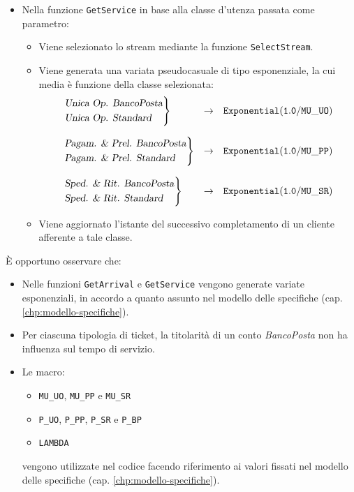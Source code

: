 \begin{itemize}
\item Nella funzione \texttt{GetService} in base alla classe d'utenza passata come parametro:
\begin{itemize}
\item Viene selezionato lo stream mediante la funzione \texttt{SelectStream}.
\item Viene generata una variata pseudocasuale di tipo esponenziale, la cui media è funzione della classe selezionata:
\begin{equation*}
\begin{array}{l l l}
\begin{rcases*}
\textsl{Unica Op. BancoPosta} \\
\textsl{Unica Op. Standard}
\end{rcases*}
& \to & \mathtt{Exponential(1.0/MU\_UO)} \\[2em]
\begin{rcases*}
\textsl{Pagam. \& Prel. BancoPosta} \\
\textsl{Pagam. \& Prel. Standard}
\end{rcases*}
& \to & \mathtt{Exponential(1.0/MU\_PP)} \\[2em]
\begin{rcases*}
\textsl{Sped. \& Rit. BancoPosta} \\
\textsl{Sped. \& Rit. Standard}
\end{rcases*}
& \to & \mathtt{Exponential(1.0/MU\_SR)}
\end{array}
\end{equation*}
\item Viene aggiornato l'istante del successivo completamento di un cliente afferente a tale classe.
\end{itemize}
\end{itemize}
È opportuno osservare che:
\begin{itemize}
\item Nelle funzioni \texttt{GetArrival} e \texttt{GetService} vengono generate variate esponenziali, in accordo a quanto assunto nel modello delle specifiche (cap. \ref{chp:modello-specifiche}).
\item Per ciascuna tipologia di ticket, la titolarità di un conto \textsl{BancoPosta} non ha influenza sul tempo di servizio.
\item Le macro:
\begin{itemize}
\item \texttt{MU\_UO}, \texttt{MU\_PP} e \texttt{MU\_SR}
\item \texttt{P\_UO}, \texttt{P\_PP}, \texttt{P\_SR} e \texttt{P\_BP}
\item \texttt{LAMBDA}
\end{itemize}
vengono utilizzate nel codice facendo riferimento ai valori fissati nel modello delle specifiche (cap. \ref{chp:modello-specifiche}). 
\end{itemize}

